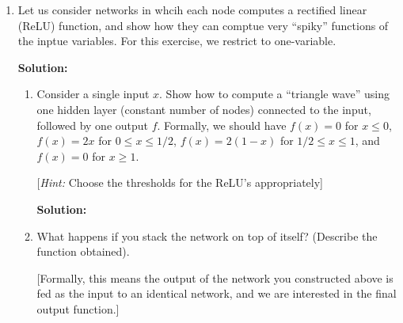 \documentclass[12pt]{article}
\begin{document}
\begin{enumerate}
Now suppose that all the weights are initialized to $0$, and suppose we start performing SGD using backprop, with a fixed learning rate. Show that at every time step, all the edge weights in a layer are equal.

   {\bf Solution:}

The equation for the sigmoid function is

\begin{align*}
  \sigma(\bm{\theta}_{i}) &= \frac{1}{1 + e^{-\bm{\theta}_{i}}}\\
  \intertext{And we can obtain the derivative as}
  \sigma^{\prime}(\bm{\theta}_{i}) &= \frac{1}{\left[1 + e^{\bm{\theta}_{i}} \right]\left[ 1 + e^{-\bm{\theta}_{i}}\right]}
  \intertext{Finally, we can say that the Jacobian/Cost function for the update is defined as}
  J_{\bm{\theta}}(\sigma) &= \text{diag}(\sigma^{\prime}(\bm{\theta}))
\end{align*}

Where the update is performed by multiplying the weight matrix by $J_{\bm{\theta}}(\sigma)$, which would obtain all of the same values in the back propogation step. There is no source of asymmetry between the neurons when they're initialized the same meaning the neural network can't learn.

\newpage

\item Let us consider networks in whcih each node computes a rectified linear (ReLU) function, and show how they can comptue very ``spiky'' functions of the inptue variables. For this exercise, we restrict to one-variable.

   {\bf Solution:}

\begin{enumerate}
  \item Consider a single input $x$. Show how to compute a ``triangle wave'' using one hidden layer (constant number of nodes) connected to the input, followed by one output $f$. Formally, we should have $f(x) = 0$ for $x \leq 0$, $f(x) = 2x$ for $0 \leq x \leq 1/2$, $f(x) = 2(1-x)$ for $1/2 \leq x \leq 1$, and $f(x) = 0$ for $x \geq 1$. 

[{\em Hint:} Choose the thresholds for the ReLU's appropriately]

   {\bf Solution:}

\item What happens if you stack the network on top of itself? (Describe the function obtained). 

[Formally, this means the output of the network you constructed above is fed as the input to an identical network, and we are interested in the final output function.]


\end{enumerate}
\end{enumerate}
\end{document}

